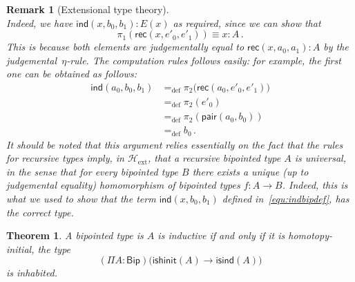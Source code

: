\documentclass[10pt,a4paper,oneside,reqno]{amsart}
\numberwithin{equation}{section}
\theoremstyle{mythm}
\newtheorem{theorem}{Theorem}[section]
\theoremstyle{mydef}
\theoremstyle{myrmk}
\newtheorem*{remark*}{Remark}
\newcommand{\ie}{\text{i.e.\ }}
\newcommand{\deq}{\equiv}
\newcommand{\defeq}{=_{\mathrm{def}}}
\newcommand{\co}{\colon}
\newcommand{\Hext}{\mathcal{H}_{\mathrm{ext}}}
\newcommand{\pair}{\mathsf{pair}}
\newcommand{\ind}{\mathsf{ind}}
\newcommand{\rec}{\mathsf{rec}}
\newcommand{\Bip}{\mathsf{Bip}}
\newcommand{\ishinit}{\mathsf{ishinit}}
\newcommand{\isind}{\mathsf{isind}}
\begin{document}
\begin{remark*}[Extensional type theory]
\begin{equation}
\end{equation}
Indeed, we have $\ind(x, b_0, b_1) \co E(x)$ as required, since we can show that
\[
\pi_1 ( \rec(x, e'_0, e'_1))  \deq x \co A \, .
\]
This is because both elements are judgementally equal to $\rec(x, a_0, a_1)  \co A$ by the
judgemental~$\eta$-rule. The computation rules follows easily: for example, the first one
can be obtained as follows:
\begin{align*} 
\ind(a_0, b_0, b_1)  & \defeq \pi_2 \big(  \rec(a_0, e'_0, e'_1) \big) \\
 & \defeq \pi_2 (e'_0) \\
 & \defeq \pi_2 (\pair(a_0, b_0)) \\
 & \defeq b_0 \, .
\end{align*}
It should be noted that this argument relies essentially on the fact that the rules for recursive types
imply, in $\Hext$, that a recursive bipointed type $A$ is universal, in the sense that for every bipointed 
type $B$ there exists a unique (up to judgemental equality) homomorphism of bipointed types $f \co A \to B$.
Indeed, this is what we used to show that the term $\ind(x, b_0, b_1)$ defined in~\eqref{equ:indbipdef}, has
the correct type.
\end{remark*}


\begin{theorem}\label{lem:BoolMainInt} A bipointed type 
is  $A$ is inductive if and only if it is homotopy-initial, \ie  the type
\[
(\Pi A \co \Bip) \big(  \ishinit(A) \rightarrow \isind(A) \big)
\] 
is inhabited.


\end{theorem}
\end{document}
